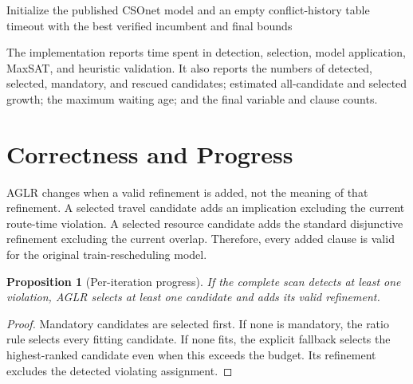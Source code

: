 \documentclass[preprint,12pt,authoryear]{elsarticle}
\newtheorem{proposition}{Proposition}
\begin{document}
\begin{algorithm}[htbp]
\caption{MaxSAT-DDD with adaptive growth-limited refinement}
\label{alg:aglr}
\footnotesize
{}
Initialize the published CSOnet model and an empty conflict-history table\;
\Return timeout with the best verified incumbent and final bounds\;
\end{algorithm}

The implementation reports time spent in detection, selection, model
application, MaxSAT, and heuristic validation. It also reports the numbers of
detected, selected, mandatory, and rescued candidates; estimated all-candidate
and selected growth; the maximum waiting age; and the final variable and clause
counts.

\section{Correctness and Progress}
\label{sec:correctness}

AGLR changes when a valid refinement is added, not the meaning of that
refinement. A selected travel candidate adds an implication excluding the
current route-time violation. A selected resource candidate adds the standard
disjunctive refinement excluding the current overlap. Therefore, every added
clause is valid for the original train-rescheduling model.

\begin{proposition}[Per-iteration progress]
If the complete scan detects at least one violation, AGLR selects at least one
candidate and adds its valid refinement.
\end{proposition}
\begin{proof}
Mandatory candidates are selected first. If none is mandatory, the ratio rule
selects every fitting candidate. If none fits, the explicit fallback selects
the highest-ranked candidate even when this exceeds the budget. Its refinement
excludes the detected violating assignment.
\end{proof}
\end{document}
